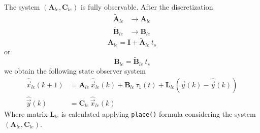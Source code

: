 \documentclass[11pt,a4paper,oneside]{book}
\numberwithin{equation}{section}
\theoremstyle{it}
\theoremstyle{definition}
\begin{document}
The system $(\mathbf{A}_{le},\mathbf{C}_{le})$ is fully observable.
After the discretization 
\begin{equation}
	\begin{aligned}
		\tilde{\mathbf{A}}_{le} &\rightarrow {\mathbf{A}}_{le} \\[6pt]
		\tilde{\mathbf{B}}_{le} &\rightarrow {\mathbf{B}}_{le}
	\end{aligned}
\end{equation}
\begin{equation}
	\mathbf{A}_{le} = \mathbf{I} + \tilde{\mathbf{A}}_{le} \ t_s
\end{equation}
or
\begin{equation}
	\mathbf{B}_{le} = \tilde{\mathbf{B}}_{le} \ t_s
\end{equation}
we obtain the following state observer system
\begin{equation}
	\begin{aligned}
		\hat{\vec{x}}_{le}(k+1)  &= {\mathbf{A}}_{le} \,\hat{\vec{x}}_{le}(k) 
		+{\mathbf{B}}_{le} \,\tau_1(t)+{\mathbf{L}}_{le} \left( \vec{y}(k) - 
		\hat{\vec{y}}(k) \right)  \\[6pt]
		\hat{\vec{y}}(k)  &= \mathbf{C}_{le} \,\hat{\vec{x}}_{le}(k)
	\end{aligned}
\end{equation}
Where matrix $\mathbf{L}_{le}$ is calculated applying \texttt{place()} formula 
considering the system $(\mathbf{A}_{le},\mathbf{C}_{le})$.
\end{document}
